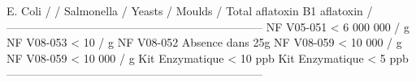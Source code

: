 \newline E. Coli \newline /   \newline / Salmonella \newline / Yeasts \newline / Moulds \newline / Total aflatoxin \newline B1 aflatoxin \newline /  \newline -------------------------------------------------------------------- \newline NF V05-051 < 6 000 000 / g \newline NF V08-053 < 10 / g \newline NF V08-052 Absence dans 25g \newline NF V08-059 < 10 000 / g \newline NF V08-059 < 10 000 / g \newline Kit Enzymatique < 10 ppb \newline Kit Enzymatique < 5 ppb \newline -------------------------------------------------------------------- \newline 